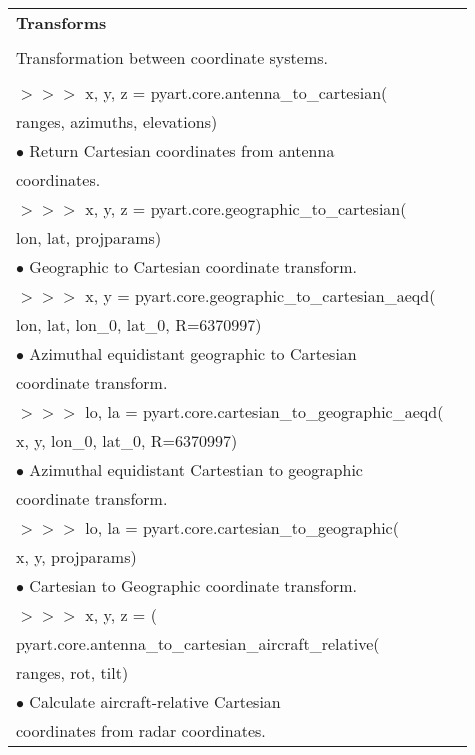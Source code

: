 \documentclass[potrait, z1paper, fontscale=0.33]{baposter} %
\begin{document}
\begin{poster}
{\begin{flushleft}
\begin{tabular}{@{}ll@{}}
\\
\multicolumn{2}{l}{\cellcolor[HTML]{DDFFFF}\bf Transforms} \\
\\
Transformation between coordinate systems.\\
\\
$>$$>$$>$ x, y, z = pyart.core.antenna\_to\_cartesian(\\
\-\hspace{1.5cm} ranges, azimuths, elevations)\\
\-\hspace{0.4cm} $\bullet$ Return Cartesian coordinates from antenna\\
\-\hspace{0.7cm} coordinates.\\
$>$$>$$>$ x, y, z = pyart.core.geographic\_to\_cartesian(\\
\-\hspace{1.5cm} lon, lat, projparams)\\
\-\hspace{0.4cm} $\bullet$ Geographic to Cartesian coordinate transform.\\
$>$$>$$>$ x, y = pyart.core.geographic\_to\_cartesian\_aeqd(\\
\-\hspace{1.5cm} lon, lat, lon\_0, lat\_0, R=6370997)\\
\-\hspace{0.4cm} $\bullet$ Azimuthal equidistant geographic to Cartesian\\
\-\hspace{0.7cm} coordinate transform.\\
$>$$>$$>$ lo, la = pyart.core.cartesian\_to\_geographic\_aeqd(\\
\-\hspace{1.5cm} x, y, lon\_0, lat\_0, R=6370997)\\
\-\hspace{0.4cm} $\bullet$ Azimuthal equidistant Cartestian to geographic\\
\-\hspace{0.7cm} coordinate transform.\\
$>$$>$$>$ lo, la = pyart.core.cartesian\_to\_geographic(\\
\-\hspace{1.5cm} x, y, projparams)\\
\-\hspace{0.4cm} $\bullet$ Cartesian to Geographic coordinate transform.\\
$>$$>$$>$ x, y, z = (\\
\-\hspace{0.6cm} pyart.core.antenna\_to\_cartesian\_aircraft\_relative(\\
\-\hspace{1.2cm} ranges, rot, tilt)\\
\-\hspace{0.4cm} $\bullet$ Calculate aircraft-relative Cartesian\\
\-\hspace{0.7cm} coordinates from radar coordinates.\\



\end{tabular}
\end{flushleft}}
\end{poster}
\end{document}
